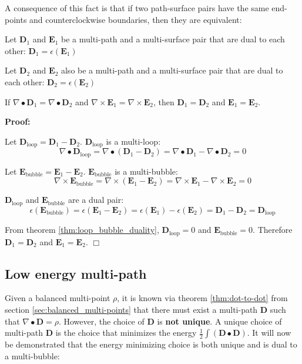 A consequence of this fact is that if two path-surface pairs have the same end-points and counterclockwise boundaries, then they are equivalent: 

\begin{cor}\label{cor:loop_bubble_duality}
Let \(\mathbf{D}_1\) and \(\mathbf{E}_1\) be a multi-path and a multi-surface pair that are dual to each other: \(\mathbf{D}_1 = \epsilon(\mathbf{E}_1)\)

Let \(\mathbf{D}_2\) and \(\mathbf{E}_2\) also be a multi-path and a multi-surface pair that are dual to each other: \(\mathbf{D}_2 = \epsilon(\mathbf{E}_2)\)

If \(\nabla \bullet \mathbf{D}_1 = \nabla \bullet \mathbf{D}_2\) and \(\nabla \times \mathbf{E}_1 = \nabla \times \mathbf{E}_2\), then \(\mathbf{D}_1 = \mathbf{D}_2\) and \(\mathbf{E}_1 = \mathbf{E}_2\).   
\end{cor}
\textbf{Proof:}

Let \(\mathbf{D}_{\text{loop}} = \mathbf{D}_1 - \mathbf{D}_2\). \(\mathbf{D}_{\text{loop}}\) is a multi-loop:
\[\nabla \bullet \mathbf{D}_{\text{loop}} = \nabla \bullet (\mathbf{D}_1 - \mathbf{D}_2) = \nabla \bullet \mathbf{D}_1 - \nabla \bullet \mathbf{D}_2 = 0\]

Let \(\mathbf{E}_{\text{bubble}} = \mathbf{E}_1 - \mathbf{E}_2\). \(\mathbf{E}_{\text{bubble}}\) is a multi-bubble: 
\[\nabla \times \mathbf{E}_{\text{bubble}} = \nabla \times (\mathbf{E}_1 - \mathbf{E}_2) = \nabla \times \mathbf{E}_1 - \nabla \times \mathbf{E}_2 = 0\]

\(\mathbf{D}_{\text{loop}}\) and \(\mathbf{E}_{\text{bubble}}\) are a dual pair:
\[\epsilon(\mathbf{E}_{\text{bubble}}) = \epsilon(\mathbf{E}_1 - \mathbf{E}_2) = \epsilon(\mathbf{E}_1) - \epsilon(\mathbf{E}_2) = \mathbf{D}_1 - \mathbf{D}_2 = \mathbf{D}_{\text{loop}}\]

From theorem \ref{thm:loop_bubble_duality}, \(\mathbf{D}_{\text{loop}} = 0\) and \(\mathbf{E}_{\text{bubble}} = 0\). Therefore \(\mathbf{D}_1 = \mathbf{D}_2\) and \(\mathbf{E}_1 = \mathbf{E}_2\). \(\Box\)



\subsection{Low energy multi-path}

Given a balanced multi-point \(\rho\), it is known via theorem \ref{thm:dot-to-dot} from section \ref{sec:balanced_multi-points} that there must exist a multi-path \(\mathbf{D}\) such that \(\nabla \bullet \mathbf{D} = \rho\). However, the choice of \(\mathbf{D}\) is {\bf not unique}. A unique choice of multi-path \(\mathbf{D}\) is the choice that minimizes the energy \(\frac{1}{2}\int (\mathbf{D} \bullet \mathbf{D})\). It will now be demonstrated that the energy minimizing choice is both unique and is dual to a multi-bubble:

